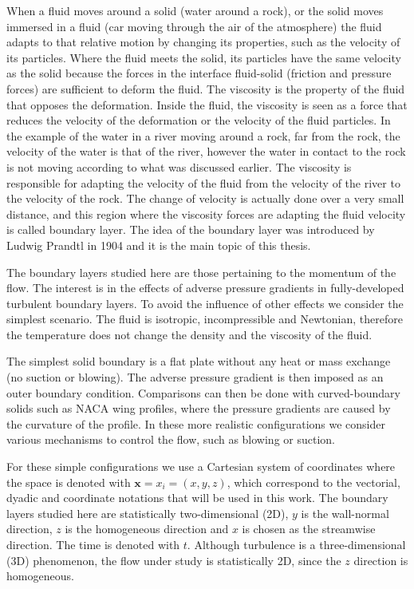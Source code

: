 When a fluid moves around a solid (water around a rock), or the solid moves immersed in a fluid  (car moving through the air of the atmosphere) the fluid adapts to that relative motion by changing its properties, such as the velocity of its particles.
Where the fluid meets the solid, its particles have the same velocity as the solid because the forces in the interface fluid-solid (friction and pressure forces) are sufficient to deform the fluid.
The viscosity is the property of the fluid that opposes the deformation. Inside the fluid, the viscosity is seen as a force that reduces the velocity of the deformation or the velocity of the fluid particles.
In the example of the water in a river moving around a rock, far from the rock, the velocity of the water is that of the river, however the water in contact to the rock is not moving according to what was discussed earlier. The viscosity is responsible for adapting the velocity of the fluid from the velocity of the river to the velocity of the rock.
The change of velocity is actually done over a very small distance, and this region where the viscosity forces are adapting the fluid velocity is called boundary layer. 
The idea of the boundary layer was introduced by Ludwig Prandtl in 1904 and it is the main topic of this thesis.

The boundary layers studied here are those pertaining to the momentum of the flow. The interest is in the effects of adverse pressure gradients in fully-developed turbulent boundary layers. To avoid the influence of other effects we consider the simplest scenario.
The fluid is isotropic, incompressible and Newtonian, therefore the temperature does not change the density and the viscosity of the fluid.

The simplest solid boundary is a flat plate without any heat or mass exchange (no suction or blowing). The adverse pressure gradient is then imposed as an outer boundary condition.
Comparisons can then be done with curved-boundary solids such as NACA wing profiles, where the pressure gradients are caused by the curvature of the profile. 
In these more realistic configurations we consider various mechanisms to control the flow, such as blowing or suction.

For these simple configurations we use a Cartesian system of coordinates where the space is denoted with $\mathbf{x}=x_i=(x,y,z)$, which correspond to the vectorial, dyadic and coordinate notations that will be used in this work.
The boundary layers studied here are statistically two-dimensional (2D), $y$ is the wall-normal direction, $z$ is the homogeneous direction and $x$ is chosen as the streamwise direction. The time is denoted with $t$.
Although turbulence is a three-dimensional (3D) phenomenon, the flow under study is statistically 2D, since the $z$ direction is homogeneous.